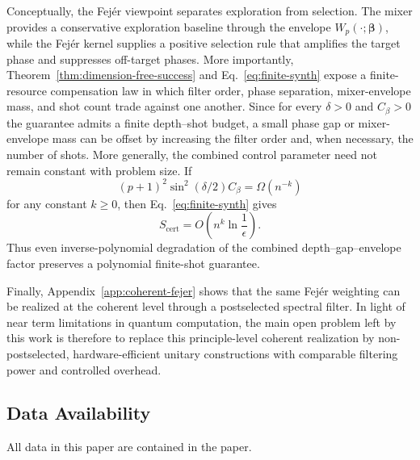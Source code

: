 \documentclass[a4paper,unpublished,onecolumn,11pt]{quantumarticle}
\theoremstyle{definition}
\theoremstyle{remark}
\begin{document}
Conceptually, the Fej\'er viewpoint separates exploration from selection. The mixer provides a conservative exploration baseline
through the envelope $W_p(\cdot;\boldsymbol\beta)$, while the Fej\'er
kernel supplies a positive selection rule that amplifies the target
phase and suppresses off-target phases. More importantly,
Theorem~\ref{thm:dimension-free-success} and
Eq.~\eqref{eq:finite-synth} expose a finite-resource compensation law
in which filter order, phase separation, mixer-envelope mass, and shot
count trade against one another. Since for every $\delta>0$ and
$C_\beta>0$ the guarantee admits a finite depth--shot budget, a small
phase gap or mixer-envelope mass can be offset by increasing the filter
order and, when necessary, the number of shots. More generally, the
combined control parameter need not remain constant with problem size.
If
\[
(p+1)^2\sin^2(\delta/2)C_\beta
=
\Omega(n^{-k})
\]
for any constant $k\geq 0$, then Eq.~\eqref{eq:finite-synth} gives
\[
S_{\mathrm{cert}}
=
O\!\left(
n^k\ln\frac{1}{\epsilon}
\right).
\]
Thus even inverse-polynomial degradation of the combined
depth--gap--envelope factor preserves a polynomial finite-shot
guarantee. %

Finally, Appendix~\ref{app:coherent-fejer} shows that the same Fej\'er weighting can be realized at the coherent level through a postselected spectral filter. In light of near term limitations in quantum computation, the main open problem left by this work is therefore to replace this principle-level coherent realization by non-postselected, hardware-efficient unitary constructions with comparable filtering power and controlled overhead.




\subsection*{Data Availability} All data in this paper are contained in the paper. %




\end{document}
